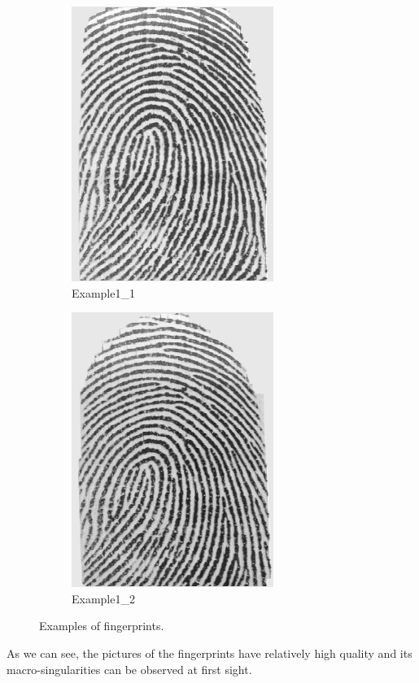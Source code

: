 \documentclass[a4paper]{article}
\begin{document}
\begin{figure}[h!]
  \centering
       \begin{subfigure}[t]{0.45\textwidth}
         \centering
         \includegraphics[scale=0.6]{Figures/example1_1}
         \caption{Example1\_1}
     \end{subfigure}%
     \quad
     \begin{subfigure}[t]{0.45\textwidth}
         \centering
         \includegraphics[scale=0.6]{Figures/example1_2}
         \caption{Example1\_2}
     \end{subfigure}
    \caption{Examples of fingerprints.}
    \label{fig:ex1a}
\end{figure}

As we can see, the pictures of the fingerprints have relatively high quality and its macro-singularities can be observed at first sight.
\end{document}
